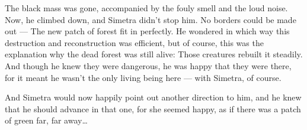 The black mass was gone, accompanied by the fouly smell and the loud noise. Now, he climbed down, and Simetra didn't stop him. No borders could be made out --- The new patch of forest fit in perfectly. He wondered in which way this destruction and reconstruction was efficient, but of course, this was the explanation why the dead forest was still alive: Those creatures rebuilt it steadily. 
And though he knew they were dangerous, he was happy that they were there, for it meant he wasn't the only living being here --- with Simetra, of course.

And Simetra would now happily point out another direction to him, and he knew that he should advance in that one, for she seemed happy, as if there was a patch of green far, far away\dots

